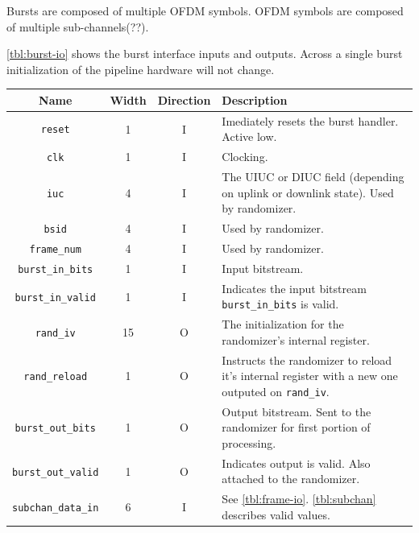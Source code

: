 \documentclass[dvips,10pt,twocolumn]{article}
\newcommand{\wire}{\texttt}
\begin{document}
Bursts are composed of multiple OFDM symbols. OFDM symbols are composed of
multiple sub-channels(??). 

\autoref{tbl:burst-io} shows the burst interface inputs and outputs.
Across a single burst initialization of the pipeline hardware will not
change.

\begin{table} \begin{tabularx}{\linewidth}{c|c|c|X}
	\label{tbl:burst-io}
	Name & Width & Direction & Description \\ \hline
	
	\wire{reset} & 1 & I & Imediately resets the burst handler. Active
	low. \\

	\wire{clk} & 1 & I & Clocking. \\

	\wire{iuc} & 4 & I & The UIUC or DIUC field (depending on uplink
	or downlink state). Used by randomizer. \\
	
	\wire{bsid} & 4 & I & Used by randomizer. \\
	
	\wire{frame\_num} & 4 & I & Used by randomizer. \\

	\wire{burst\_in\_bits} & 1 & I & Input bitstream. \\

	\wire{burst\_in\_valid} & 1 &  I & Indicates the input bitstream
	\wire{burst\_in\_bits} is valid. \\

	\wire{rand\_iv} & 15 & O & The initialization for
	the randomizer's internal register. \\

	\wire{rand\_reload} & 1 & O & Instructs the randomizer to reload
	it's internal register with a new one outputed on
	\wire{rand\_iv}. \\

	\wire{burst\_out\_bits} & 1 & O & Output bitstream. Sent to the
	randomizer for first portion of processing. \\

	\wire{burst\_out\_valid} & 1 & O & Indicates output is valid.
	Also attached to the randomizer. \\

	\wire{subchan\_data\_in} & 6 & I & See \autoref{tbl:frame-io}.
	\autoref{tbl:subchan} describes valid values. \\


\end{tabularx}
\end{table}
\end{document}

